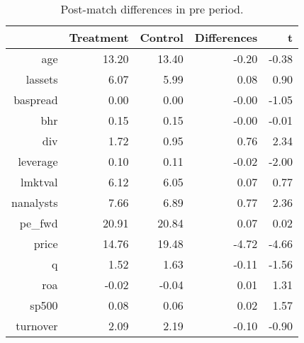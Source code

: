 \begin{table}[ht]
\centering
\begin{tabular}{rrrrr}
  \hline
 & Treatment & Control & Differences & t \\ 
  \hline
age & 13.20 & 13.40 & -0.20 & -0.38 \\ 
  lassets & 6.07 & 5.99 & 0.08 & 0.90 \\ 
  baspread & 0.00 & 0.00 & -0.00 & -1.05 \\ 
  bhr & 0.15 & 0.15 & -0.00 & -0.01 \\ 
  div & 1.72 & 0.95 & 0.76 & 2.34 \\ 
  leverage & 0.10 & 0.11 & -0.02 & -2.00 \\ 
  lmktval & 6.12 & 6.05 & 0.07 & 0.77 \\ 
  nanalysts & 7.66 & 6.89 & 0.77 & 2.36 \\ 
  pe\_fwd & 20.91 & 20.84 & 0.07 & 0.02 \\ 
  price & 14.76 & 19.48 & -4.72 & -4.66 \\ 
  q & 1.52 & 1.63 & -0.11 & -1.56 \\ 
  roa & -0.02 & -0.04 & 0.01 & 1.31 \\ 
  sp500 & 0.08 & 0.06 & 0.02 & 1.57 \\ 
  turnover & 2.09 & 2.19 & -0.10 & -0.90 \\ 
   \hline
\end{tabular}
\caption{Post-match differences in pre period.} 
\end{table}

